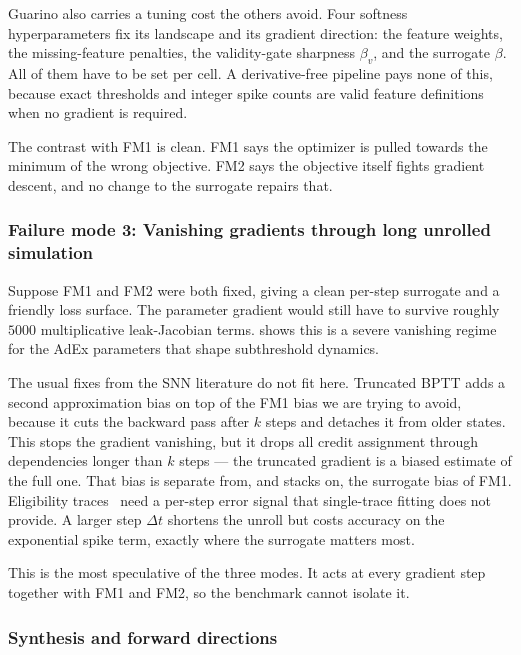 Guarino also carries a tuning cost the others avoid.
Four softness hyperparameters fix its landscape and its gradient direction: the feature weights, the missing-feature penalties, the validity-gate sharpness $\beta_v$, and the surrogate $\beta$.
All of them have to be set per cell.
A derivative-free pipeline pays none of this, because exact thresholds and integer spike counts are valid feature definitions when no gradient is required.

The contrast with FM1 is clean.
FM1 says the optimizer is pulled towards the minimum of the wrong objective.
FM2 says the objective itself fights gradient descent, and no change to the surrogate repairs that.

\subsubsection{Failure mode 3: Vanishing gradients through long unrolled simulation}\label{sec:discussion:decay}

Suppose FM1 and FM2 were both fixed, giving a clean per-step surrogate and a friendly loss surface.
The parameter gradient would still have to survive roughly $5000$ multiplicative leak-Jacobian terms.
 shows this is a severe vanishing regime for the \gls{AdEx} parameters that shape subthreshold dynamics.

The usual fixes from the \gls{SNN} literature do not fit here.
Truncated \gls{BPTT} adds a second approximation bias on top of the FM1 bias we are trying to avoid, because it cuts the backward pass after $k$ steps and detaches it from older states.
This stops the gradient vanishing, but it drops all credit assignment through dependencies longer than $k$ steps --- the truncated gradient is a biased estimate of the full one.
That bias is separate from, and stacks on, the surrogate bias of FM1.
Eligibility traces~\cite{Bellec2020} need a per-step error signal that single-trace fitting does not provide.
A larger step $\Delta t$ shortens the unroll but costs accuracy on the exponential spike term, exactly where the surrogate matters most.

This is the most speculative of the three modes.
It acts at every gradient step together with FM1 and FM2, so the benchmark cannot isolate it.

\subsubsection{Synthesis and forward directions}\label{sec:discussion:forward}

